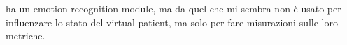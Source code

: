 %



\cite{dupuy2019virtual} ha un emotion recognition module, ma da quel che mi sembra non è usato per influenzare lo stato del virtual patient, ma solo per fare misurazioni sulle loro metriche. 



